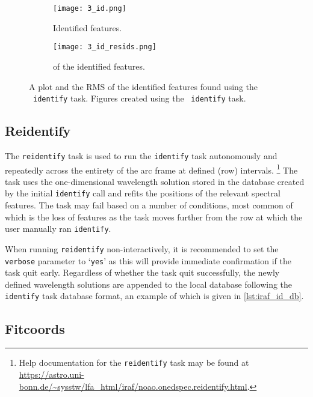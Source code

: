 \begin{figure}
    \centering
    \begin{subfigure}[b]{0.49\textwidth}
        \centering
        \texttt{[image: 3\_id.png]}
        \caption{Identified features.}
    \end{subfigure}
    \hfill
    \begin{subfigure}[b]{0.49\textwidth}
        \centering
        \texttt{[image: 3\_id\_resids.png]}
        \caption{ of the identified features.}
    \end{subfigure}
    \caption{A plot and the \gls{RMS} of the identified features found using the \iraf\ \texttt{identify} task. Figures created using the \iraf\ \texttt{identify} task.}
    \label{fig:iraf_id_plot}
\end{figure}

\subsection{Reidentify} \label{subsec:iraf_reidentify}

The \texttt{reidentify} task is used to run the \texttt{identify} task autonomously and repeatedly across the entirety of the arc frame at defined (row) intervals.%
\footnote{Help documentation for the \texttt{reidentify} task may be found at \url{https://astro.uni-bonn.de/~sysstw/lfa_html/iraf/noao.onedspec.reidentify.html}.}
The task uses the one-dimensional wavelength solution stored in the database created by the initial \texttt{identify} call and refits the positions of the relevant spectral features. The task may fail based on a number of conditions, most common of which is the loss of features as the task moves further from the row at which the user manually ran \texttt{identify}.

\pagebreak

When running \texttt{reidentify} non-interactively, it is recommended to set the \texttt{verbose} parameter to `\texttt{yes}' as this will provide immediate confirmation if the task quit early. Regardless of whether the task quit successfully, the newly defined wavelength solutions are appended to the local database following the \texttt{identify} task database format, an example of which is given in \autoref{lst:iraf_id_db}.

\subsection{Fitcoords} \label{subsec:iraf_fitcoords}

